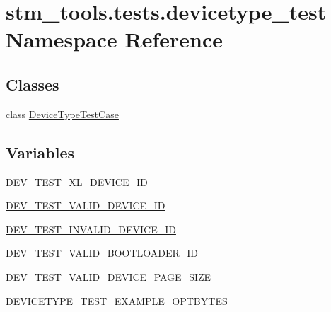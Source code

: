 \hypertarget{namespacestm__tools_1_1tests_1_1devicetype__test}{}\section{stm\+\_\+tools.\+tests.\+devicetype\+\_\+test Namespace Reference}
\label{namespacestm__tools_1_1tests_1_1devicetype__test}
\subsection*{Classes}
\begin{DoxyCompactItemize}
\item 
class \hyperlink{classstm__tools_1_1tests_1_1devicetype__test_1_1DeviceTypeTestCase}{Device\+Type\+Test\+Case}
\end{DoxyCompactItemize}
\subsection*{Variables}
\begin{DoxyCompactItemize}
\item 
\hyperlink{namespacestm__tools_1_1tests_1_1devicetype__test_a673b122c6c4c7ffc0843953ef69a6990}{D\+E\+V\+\_\+\+T\+E\+S\+T\+\_\+\+X\+L\+\_\+\+D\+E\+V\+I\+C\+E\+\_\+\+ID}
\item 
\hyperlink{namespacestm__tools_1_1tests_1_1devicetype__test_ada001cf59610dae773467257abade9b1}{D\+E\+V\+\_\+\+T\+E\+S\+T\+\_\+\+V\+A\+L\+I\+D\+\_\+\+D\+E\+V\+I\+C\+E\+\_\+\+ID}
\item 
\hyperlink{namespacestm__tools_1_1tests_1_1devicetype__test_abeb943b6d91f9df1bffc0b026c26bce4}{D\+E\+V\+\_\+\+T\+E\+S\+T\+\_\+\+I\+N\+V\+A\+L\+I\+D\+\_\+\+D\+E\+V\+I\+C\+E\+\_\+\+ID}
\item 
\hyperlink{namespacestm__tools_1_1tests_1_1devicetype__test_ac6adf6af40a6afd2e7af8902b24c3cc1}{D\+E\+V\+\_\+\+T\+E\+S\+T\+\_\+\+V\+A\+L\+I\+D\+\_\+\+B\+O\+O\+T\+L\+O\+A\+D\+E\+R\+\_\+\+ID}
\item 
\hyperlink{namespacestm__tools_1_1tests_1_1devicetype__test_a81339cebc02ac225ee94cf1b272d37e2}{D\+E\+V\+\_\+\+T\+E\+S\+T\+\_\+\+V\+A\+L\+I\+D\+\_\+\+D\+E\+V\+I\+C\+E\+\_\+\+P\+A\+G\+E\+\_\+\+S\+I\+ZE}
\item 
\hyperlink{namespacestm__tools_1_1tests_1_1devicetype__test_a64b07338c65bc4dcded6e6e2570e4827}{D\+E\+V\+I\+C\+E\+T\+Y\+P\+E\+\_\+\+T\+E\+S\+T\+\_\+\+E\+X\+A\+M\+P\+L\+E\+\_\+\+O\+P\+T\+B\+Y\+T\+ES}
\end{DoxyCompactItemize}


